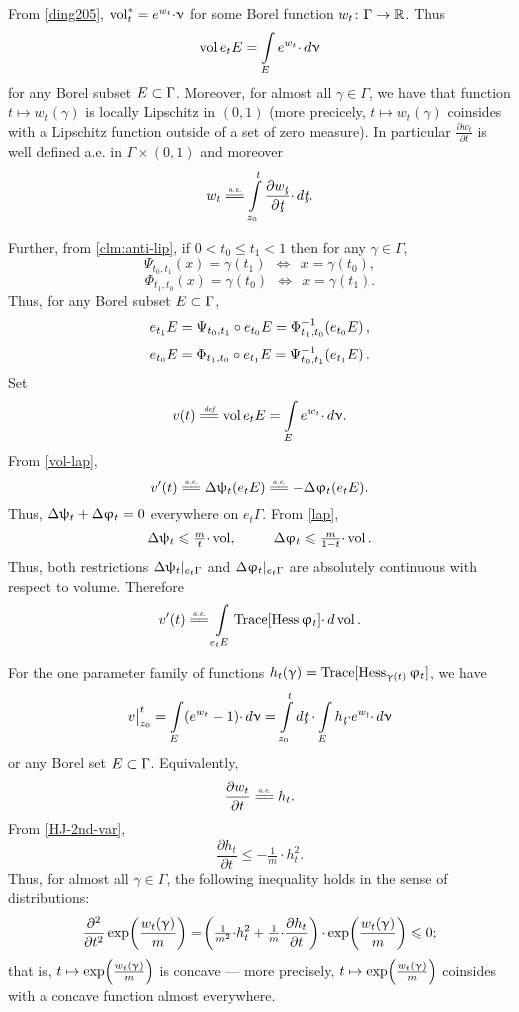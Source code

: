 \documentclass[oneside,a4paper]{article}
\begin{document}
{\sloppy
{}
From \ref{ding205}, $\mathop{\rm vol}\nolimits_t^*=e^{w_t}{\cdot}\upnu$ for some Borel function $w_t\colon\Gamma\to\mathbb{R}$.
Thus
$$\mathop{\rm vol}\nolimits e_t E=\int\limits_{E}e^{w_t}{\cdot}\,d\upnu$$ 
for any Borel subset $E\subset \Gamma$.
Moreover, for almost all $\gamma\in\Gamma$, we have that function $t\mapsto w_t(\gamma)$ is locally Lipschitz in $(0,1)$ (more precicely, $t\mapsto w_t(\gamma)$ coinsides with a Lipschitz function outside of a set of zero measure).
In particular $\frac{\partial w_t}{\partial t}$ is well defined a.e. in $\Gamma\times (0,1)$
and moreover 
$$w_t
\ae
\int\limits_{z_0}^{t}\frac{\partial w_\under{t}}{\partial \under{t}}{\cdot}\,d\under{t}.$$

}\medskip

Further, from \ref{clm:anti-lip}, if $0<t_0\le t_1<1$ then for any $\gamma\in\Gamma$,
$$\Psi_{t_0,t_1}(x)= \gamma(t_1)\ \ \Longleftrightarrow\ \ x=\gamma({t_0}),$$
$$\Phi_{t_1,t_0}(x)= \gamma({t_0})\ \ \Longleftrightarrow\ \ x=\gamma({t_1}).$$
Thus, for any Borel subset $E\subset \Gamma$,
$$e_{t_1}E=\Psi_{t_0,t_1}\circ e_{t_0}E=\Phi^{-1}_{t_1,t_0}\!\left( e_{t_0}E\right),$$
$$e_{t_0}E=\Phi_{t_1,t_0}\circ  e_{t_1}E=\Psi^{-1}_{t_0,t_1}\!\left(  e_{t_1}E\right).$$
Set 
$$v(t)
\df
\vol e_t E
=
\int\limits_{E}e^{w_t}{\cdot}\,d\nu.$$ 
From \ref{vol-lap},
$$v'(t)
\ae
\Lap\psi_t(e_t E)
\ae
-\Lap\phi_t(e_t E).$$ 
Thus,
$\Delta \uppsi_t+\Delta\upvarphi_t=0$
everywhere on $e_t\Gamma$.
From \ref{lap},
$$\Lap\psi_t\le\tfrac m t{\cdot}\vol,\ \ \ \ \ \ \ \ \Lap\phi_t\le\tfrac m {1-t}{\cdot}\vol.$$
Thus, both restrictions  $\Delta \uppsi_t|_{e_t\Gamma}$ and $\Delta\upvarphi_t|_{e_t\Gamma}$
are absolutely continuous with respect to volume.
Therefore
$$v'(t)
\ae
\int\limits_{e_t E}\Trace[\Hess\phi_t]{\cdot}\,d\vol.
$$

For the one parameter family of functions $h_t(\upgamma)=\text{\rm Trace}[\operatorname{Hess}_{\upgamma(t)}\upvarphi_t]$, we have
$$\bigl.v\bigr|_{z_0}^t
=
\int\limits_E(e^{w_t}-1){\cdot}\,d\nu
=
\int\limits_{z_0}^t d\under{t}\cdot\int\limits_E h_\under{t}{\cdot}e^{w_\under{t}}{\cdot}\,d\nu$$
or any Borel set $E\subset \Gamma$. 
Equivalently, 
$$\frac{\partial w_t}{\partial t}
\ae 
h_t.$$
From \ref{HJ-2nd-var}, 
$$\frac{\partial h_t}{\partial t}\le -\tfrac1m{\cdot} h_t^2.$$
Thus, for almost all $\gamma\in\Gamma$, the following inequality holds in the sense of distributions:
$$\frac{\partial^2}{\partial t^2}\exp\!\left(\frac{w_t(\upgamma)}m\right)
=
\!\left(\tfrac1{m^2}{\cdot}{h_t^2}+\tfrac1{m}{\cdot}\frac{\partial h_t}{\partial t}\right){\cdot}\exp\!\left(\frac{w_t(\upgamma)}m\right)\leqslant 0;
$$ 
that is, $t\mapsto \exp\!\left(\frac{w_t(\upgamma)}m\right)$ is concave
--- more precisely, $t\mapsto \exp\!\left(\frac{w_t(\upgamma)}m\right)$ coinsides with a concave function almost everywhere.
\end{document}
